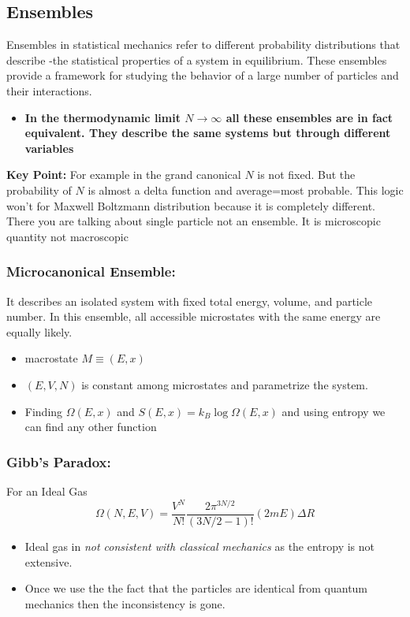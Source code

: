 \documentclass{article}
\begin{document}
\subsection{Ensembles}
Ensembles in statistical mechanics refer to different probability distributions that describe -the statistical properties of a system in equilibrium. These ensembles provide a framework for studying the behavior of a large number of particles and their interactions.
\begin{itemize}
    \item \textbf{In the thermodynamic limit $N \rightarrow \infty
$ all these ensembles are in fact equivalent. They describe the same systems but
through different variables}
\end{itemize}
\textbf{Key Point:} For example in the grand canonical $N$ is not fixed. But the probability of $N$ is almost a delta function and
average=most probable. This logic won't for Maxwell Boltzmann distribution because it is completely different. There
you are talking about single particle not an ensemble. It is microscopic quantity not macroscopic


\subsubsection{Microcanonical Ensemble:} It describes an isolated system with fixed total energy, volume, and particle number. In this ensemble, all accessible microstates with the same energy are equally likely.
\begin{itemize}
    \item macrostate $M \equiv (E, x)
$
    \item $(E,V,N)$ is constant among microstates and parametrize the system.
    \item Finding $\Omega(E, x)$ and $S(E, x) = k_B \log \Omega(E, x)
$ and using entropy we can find any other function

\end{itemize}
\subsubsection{Gibb's Paradox:} 
For an Ideal Gas
$$\Omega(N, E, V)
=\frac{{V^N}}{{N!}}\frac{{2\pi^{3N/2}}}{{(3N/2 - 1)!}}(2mE) \Delta R$$
\begin{itemize}
    \item Ideal gas in \textit{not consistent with classical mechanics} as the entropy is not extensive.

    \item Once we use the the fact that the particles are identical from quantum mechanics then the inconsistency is gone.
\end{itemize}
\end{document}
